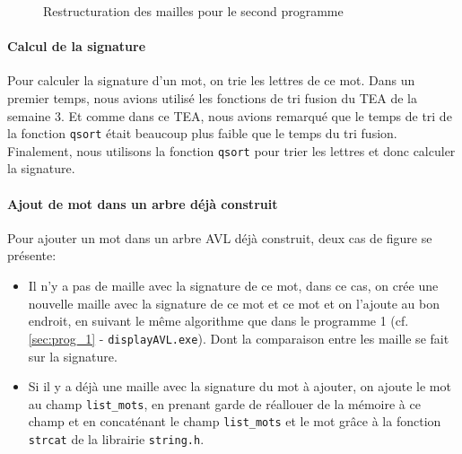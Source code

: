 \documentclass{article} %
\begin{document}
\begin{figure}[H]
  \begin{center}
  \end{center}
  \caption{Restructuration des mailles pour le second programme}
  \label{fig:restruc_pro2}
\end{figure}

\paragraph{Calcul de la signature} Pour calculer la signature d'un mot, on trie les lettres de ce mot. Dans un premier temps, nous avions utilisé les fonctions de tri fusion du TEA de la semaine 3. Et comme dans ce TEA, nous avions remarqué que le temps de tri de la fonction \texttt{qsort} était beaucoup plus faible que le temps du tri fusion. Finalement, nous utilisons la fonction \texttt{qsort} pour trier les lettres et donc calculer la signature. 

\paragraph{Ajout de mot dans un arbre déjà construit} Pour ajouter un mot dans un arbre AVL déjà construit, deux cas de figure se présente: \begin{itemize}
  \item Il n'y a pas de maille avec la signature de ce mot, dans ce cas, on crée une nouvelle maille avec la signature de ce mot et ce mot et on l'ajoute au bon endroit, en suivant le même algorithme que dans le programme 1 (cf. \ref{sec:prog_1} - \texttt{displayAVL.exe}). Dont la comparaison entre les maille se fait sur la signature. 
  \item Si il y a déjà une maille avec la signature du mot à ajouter, on ajoute le mot au champ \texttt{list\_mots}, en prenant garde de réallouer de la mémoire à ce champ et en concaténant le champ \texttt{list\_mots} et le mot grâce à la fonction \texttt{strcat} de la librairie \texttt{string.h}.
\end{itemize}
\end{document}
